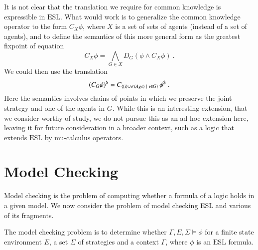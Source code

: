 \documentclass[a4wide]{article}
\newcommand{\ESL}{\mbox{ESL}}
\theoremstyle{examplesty}
\newcommand{\strat}{\sigma}
\newcommand{\Ags}{\mathit{Ags}}
\newcommand{\Env}{E}
\newcommand{\Strat}{\Sigma}
\newcommand{\Strats}{\Sigma}
\newcommand{\Cont}{\Gamma}
\begin{document}
It is not clear that the translation we require for common knowledge 
is expressible in $\ESL$. What would work is to generalize the common knowledge 
operator to the form $C_X \phi$, where $X$ is a set of sets of agents (instead of a set of agents), 
and to define the semantics of this more general form as the greatest fixpoint of equation 
  $$ C_X \phi =  \bigwedge_{G\in X} D_G (\phi \land C_X\phi)~. $$
We could then use the translation 
$$ \trlk{(C_G \phi)} = C_{\{ \{i\} \cup \strat(\Ags) ~|~ i \in G\}}\, \trlk{\phi}~.$$ 
Here the semantics involves chains of points in which we preserve
the joint strategy and one of the agents in $G$. 
While this is an interesting extension, that we consider worthy of study, we do not pursue 
this as an ad hoc extension here, leaving it for future consideration in a broader context, such as a logic that
extends $\ESL$ by mu-calculus operators. 
   
\section{Model Checking}\label{sec:mc}

\newcommand{\stratdesc}{sd}
\newcommand{\stratconf}{\gamma}

Model checking is the problem of computing  whether a formula of a logic holds in a given model. 
We now consider the problem of model checking ESL and various of its fragments. 


The model checking problem is to  determine whether $\Cont, \Env,\Strat\models \phi$ for a finite state environment $\Env$, a set $\Strats$ of strategies 
and a context $\Cont$, where  $\phi$ is an $\ESL$ formula. 
\end{document}

